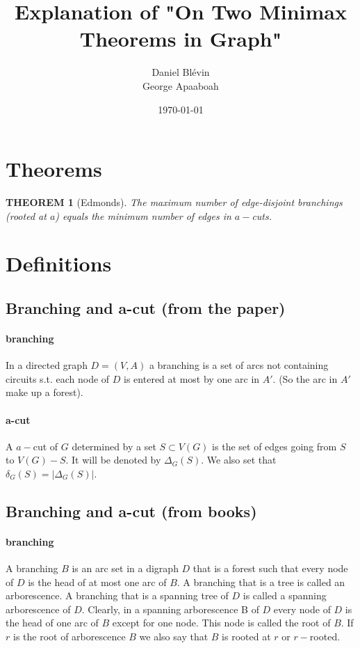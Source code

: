 \documentclass{article}
\title{Explanation of "On Two Minimax Theorems in Graph"}
\author{Daniel Blévin\\George Apaaboah}
\date\today
\begin{document}
\maketitle
\tableofcontents
\newtheorem{edmonds_theorem}{THEOREM}

\section{Theorems}

\begin{edmonds_theorem}[Edmonds]
The maximum number of edge-disjoint branchings (rooted at $a$) 
equals the minimum number of edges in $a-$cuts.
\end{edmonds_theorem}

\section{Definitions}

\subsection*{Branching and a-cut (from the paper)}

\paragraph{branching}
In a directed graph $D = (V, A)$ a branching is a set of arcs not containing 
circuits s.t. each node of $D$ is entered at most by one arc in $A'$. 
(So the arc in $A'$ make up a forest). %

\paragraph{a-cut}
A $a-$cut of $G$ determined by a set $S \subset V(G)$ is the set of
edges going from $S$ to $V(G) - S$. 
It will be denoted by $\Delta_G(S)$.
We also set that $\delta_G(S) = |\Delta_G(S)|$.


\subsection*{Branching and a-cut (from books)}
\paragraph{branching}
A branching $B$ is an arc set in a digraph $D$ that is a forest such that every node of $D$ 
is the head of at most one arc of $B$. 
A branching that is a tree is called an arborescence.
A branching that is a spanning tree of $D$ is called a spanning arborescence of $D$. 
Clearly, in a spanning arborescence B of $D$ every node of $D$ is the head of one arc of $B$ 
except for one node. 
This node is called the root of $B$. 
If $r$ is the root of arborescence $B$ we also say that $B$ is rooted at $r$ or $r-$rooted.
\end{document}
